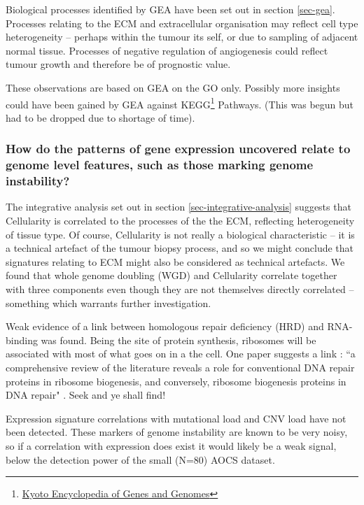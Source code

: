 \documentclass[tikz, 12pt,a4paper,oneside,fleqn]{article}
\begin{document}
Biological processes identified by GEA have been set out in section \ref{sec-gea}.   Processes relating to the ECM and extracellular organisation may reflect cell type heterogeneity -- perhaps within the tumour its self, or due to sampling of adjacent normal tissue.   Processes of negative regulation of angiogenesis could reflect tumour growth and therefore be of prognostic value.   

These observations are based on GEA on the GO only.  Possibly more insights could have been gained by GEA against KEGG\footnote{\href{https://www.genome.jp/kegg/pathway.html}{Kyoto Encyclopedia of Genes and Genomes}} Pathways. (This was begun but had to be dropped due to shortage of time).

\subsubsection*{How do the patterns of gene expression uncovered relate to genome level features, such as those marking genome instability?}

The integrative analysis set out in section \ref{sec-integrative-analysis} suggests that  Cellularity is correlated to the processes of the the ECM, reflecting heterogeneity of tissue type.   Of course, Cellularity is not really a biological characteristic -- it is a technical artefact of the tumour biopsy process, and so we might conclude that signatures relating to ECM might also be considered as technical artefacts.  We found that whole genome doubling (WGD) and Cellularity correlate together with three components even though they are not themselves directly correlated -- something which warrants further investigation.

Weak evidence of a link between homologous repair deficiency (HRD) and RNA-binding was found.   Being the site of protein synthesis, ribosomes will be associated with most of what goes on in a the cell.   One paper suggests a link : ``a comprehensive review of the literature reveals a role for conventional DNA repair proteins in ribosome biogenesis, and conversely, ribosome biogenesis proteins in DNA repair" \cite{Ogawa2018}.   Seek and ye shall find!

Expression signature correlations with mutational load and  CNV load have not been detected.  These markers of genome instability are known to be very noisy, so if a correlation with expression does exist it would likely be a weak signal, below the detection power of the small (N=80) AOCS dataset.
\end{document}

